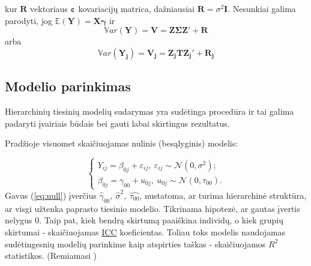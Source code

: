 \documentclass[12pt,a4paper]{article}
\begin{document}
kur $\mathbf{R}$ vektoriaus $\boldsymbol{\varepsilon}$ kovariacijų matrica, dažniausiai $\mathbf{R}=\sigma^2\mathbf{I}$. Nesunkiai galima parodyti, jog $\mathbb{E}(\mathbf{Y})=\mathbf{X}\boldsymbol{\gamma}$ ir
\begin{equation} \label{eq:var}
\mathbb{V}ar(\mathbf{Y})=\mathbf{V}=\mathbf{Z\Sigma Z}'+\mathbf{R}
\end{equation}
arba
\begin{equation} \label{eq:varj}
\mathbb{V}ar(\mathbf{Y_j})=\mathbf{V_j}=\mathbf{Z_jTZ_j}'+\mathbf{R_j}
\end{equation}


\subsection{Modelio parinkimas} \label{subsec:parink}
\indent Hierarchinių tiesinių modelių sudarymas yra sudėtinga procedūra ir tai galima padaryti įvairiais būdais bei gauti labai skirtingus rezultatus.

\indent Pradžioje visuomet skaičiuojamas nulinis (besąlyginis) modelis:

\begin{equation}\label{eq:null}
\left\{
\begin{array}{l}
Y_{ij}=\beta_{0j}+\varepsilon_{ij}, \ \varepsilon_{ij}\sim \mathcal{N}(0, \sigma^2);\\
\beta_{0j}=\gamma_{00}+u_{0j}, \ u_{0j}\sim \mathcal{N}(0, \tau_{00}).
\end{array} \right.
\end{equation}
\indent Gavus (\ref{eq:null}) įverčius $\hat{\gamma}_{00}, \ \hat{\sigma}^2,\ \hat{\tau_{00}}$, nustatoma, ar turima hierarchinė struktūra, ar visgi užtenka paprasto tiesinio modelio. Tikrinama hipotezė, ar gautas įvertis nelygus 0. Taip pat, kiek bendrą skirtumą paaiškina individų, o kiek grupių skirtumai - skaičiuojamas \hyperlink{icc}{ICC} koeficientas. Toliau toks modelis naudojamas sudėtingesnių modelių parinkime kaip atspirties taškas - skaičiuojamos \hyperlink{r2}{$R^2$} statistikos. (Remiamasi \cite{cek})
\end{document}
